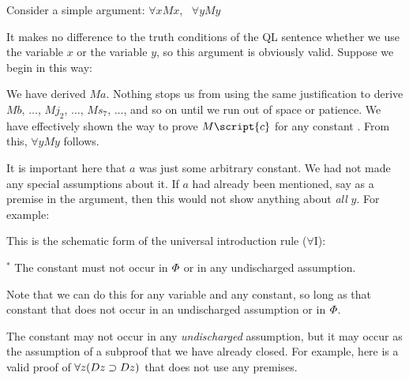 Consider a simple argument: $\forall x Mx$, \therefore\ $\forall y My$

It makes no difference to the truth conditions of the QL sentence whether we use the variable $x$ or the variable $y$, so this argument is obviously valid. Suppose we begin in this way:

\begin{ndproof}
	 
	 
\end{ndproof}

We have derived $Ma$. Nothing stops us from using the same justification to derive $Mb$, $\ldots$, $Mj_2$, $\ldots$, $Ms_7$, $\ldots$, and so on until we run out of space or patience. We have effectively shown the way to prove $M\script{c}$ for any constant . From this, $\forall y My$ follows.

\begin{ndproof}
	 
	 
	 
\end{ndproof}

It is important here that $a$ was just some arbitrary constant. We had not made any special assumptions about it. If $a$ had already been mentioned, say as a premise in the argument, then this would not show anything about \emph{all} $y$. For example:

\begin{ndproof}
	 
	 
\end{ndproof}


This is the schematic form of the universal introduction rule ($\forall$I):

\begin{ndproof}
	 
\end{ndproof}
$^\ast$ The constant  must not occur in $\varPhi{}$ or in any undischarged assumption.

Note that we can do this for any variable and any constant, so long as that constant that does not occur in an undischarged assumption or in $\varPhi{}$.

The constant may not occur in any \emph{undischarged} assumption, but it may occur as the assumption of a subproof that we have already closed. For example, here is a valid proof of $\forall z(Dz \supset Dz)$ that does not use any premises.

